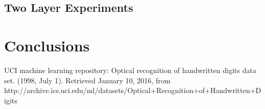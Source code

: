 \documentclass[11]{article}
\begin{document}
\subsection{Two Layer Experiments}

\section{Conclusions}

\begin{thebibliography}{9}
UCI machine learning repository: Optical recognition of handwritten digits data set. (1998, July 1). Retrieved January 10, 2016, from http://archive.ics.uci.edu/ml/datasets/Optical+Recognition+of+Handwritten+Digits

\end{thebibliography}
\end{document}
